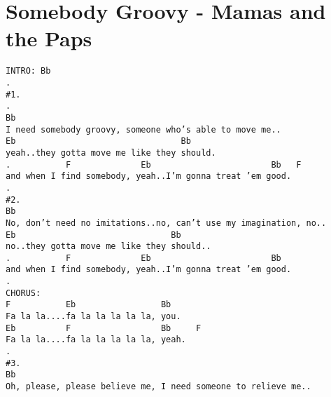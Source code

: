 \newpage
\section{Somebody Groovy - Mamas and the Paps}
\label{Somebody Groovy - Mamas and the Paps}
\texttt{INTRO:\ Bb\\
.\ \ \\
\#1.\ \ \ \\
.\ \ \\
Bb\ \\
I\ need\ somebody\ groovy,\ someone\ who's\ able\ to\ move\ me..\\
Eb\ \ \ \ \ \ \ \ \ \ \ \ \ \ \ \ \ \ \ \ \ \ \ \ \ \ \ \ \ \ \ \ \ Bb\ \\
yeah..they\ gotta\ move\ me\ like\ they\ should.\ \\
.\ \ \ \ \ \ \ \ \ \ \ F\ \ \ \ \ \ \ \ \ \ \ \ \ \ Eb\ \ \ \ \ \ \ \ \ \ \ \ \ \ \ \ \ \ \ \ \ \ \ \ Bb\ \ \ F\\
and\ when\ I\ find\ somebody,\ yeah..I'm\ gonna\ treat\ 'em\ good.\ \\
.\ \ \\
\#2.\ \ \ \\
Bb\ \\
No,\ don't\ need\ no\ imitations..no,\ can't\ use\ my\ imagination,\ no..\ \\
Eb\ \ \ \ \ \ \ \ \ \ \ \ \ \ \ \ \ \ \ \ \ \ \ \ \ \ \ \ \ \ \ Bb\ \\
no..they\ gotta\ move\ me\ like\ they\ should..\ \\
.\ \ \ \ \ \ \ \ \ \ \ F\ \ \ \ \ \ \ \ \ \ \ \ \ \ Eb\ \ \ \ \ \ \ \ \ \ \ \ \ \ \ \ \ \ \ \ \ \ \ \ Bb\ \\
and\ when\ I\ find\ somebody,\ yeah..I'm\ gonna\ treat\ 'em\ good.\ \\
.\ \ \\
CHORUS:\ \ \\
F\ \ \ \ \ \ \ \ \ \ \ Eb\ \ \ \ \ \ \ \ \ \ \ \ \ \ \ \ \ Bb\ \ \ \ \ \ \ \ \ \\
Fa\ la\ la....fa\ la\ la\ la\ la\ la,\ you.\ \\
Eb\ \ \ \ \ \ \ \ \ \ F\ \ \ \ \ \ \ \ \ \ \ \ \ \ \ \ \ \ Bb\ \ \ \ \ F\ \\
Fa\ la\ la....fa\ la\ la\ la\ la\ la,\ yeah.\ \\
.\ \ \\
\#3.\ \ \ \\
Bb\ \\
Oh,\ please,\ please\ believe\ me,\ I\ need\ someone\ to\ relieve\ me..\\
}
